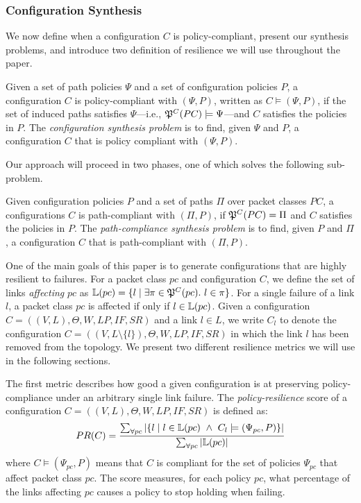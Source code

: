 \subsubsection{Configuration Synthesis}

\noindent We now define when a configuration $C$ is policy-compliant, present our synthesis problems, and introduce two definition of resilience we will use throughout the paper.
\begin{definition} \label{def:policycompliance}
	Given a set of path policies $\Psi$ and a set of configuration policies $P$,
	a configuration $C$ is policy-compliant with $(\Psi,P)$,  
	written as $C \models (\Psi,P)$, if the set of
	induced paths satisfies $\Psi$---i.e., $\mathfrak{P}^C(PC) \models \Psi$---and $C$ satisfies the policies in $P$.
	The \emph{configuration synthesis problem} is to find, given $\Psi$ and $P$,
a configuration $C$ that is policy compliant with $(\Psi,P)$.
\end{definition}

Our approach will proceed in two phases,
one of which solves the following sub-problem.  
\begin{definition} \label{def:pathcompliance}
Given configuration policies $P$
and a set of paths $\Pi$ over packet classes $PC$,
	a configurations $C$ is path-compliant with 
	$(\Pi,P)$,
	if $\mathfrak{P}^C(PC)=\Pi$ and $C$ satisfies the policies in $P$.
	The \emph{path-compliance synthesis problem} is to find, given $P$ and $\Pi$,
a configuration $C$ that is path-compliant with $(\Pi,P)$.
\end{definition}

One of the main goals of this paper is to 
generate configurations that are highly resilient to failures.
For a packet class $pc$ and configuration $C$, we define 
the set of links \emph{affecting} $pc$ as 
$\mathbb{L}(pc) = \{l \mid \exists \pi \in \mathfrak{P}^C(pc).~l \in \pi  \}$.
For a single failure of a link $l$, a packet class $pc$ is affected 
if only if $l \in \mathbb{L}(pc)$. 
Given a configuration
$C=((V,L), \Theta,W,LP,IF,SR)$ and a link $l\in L$,
we write $C_l$ 
to denote the configuration
$C=((V,L\setminus\{l\}), \Theta,W,LP,IF,SR)$
in which the link $l$ has been removed from the topology.
We present two different resilience metrics we will use in the following sections. 


The first metric describes how good a given configuration
is at preserving policy-compliance under an 
arbitrary single link failure. 
The \emph{policy-resilience} score of a configuration 
$C=((V,L), \Theta,W,LP,IF,SR)$
is defined as:
\[
PR(C)=\frac{\sum_{\forall pc} |\{ l \mid l \in \mathbb{L}(pc) ~\wedge~ C_l \models (\Psi_{pc}, P) \}|}
{\sum_{\forall pc} |\mathbb{L}(pc)|}
\]
where $C \models (\Psi_{pc}, P)$ means that $C$ is 
compliant for the set of policies $\Psi_{pc}$ that affect packet class $pc$.
The score measures, for each policy $pc$, what percentage of the links affecting $pc$
causes a policy to stop holding when failing.


